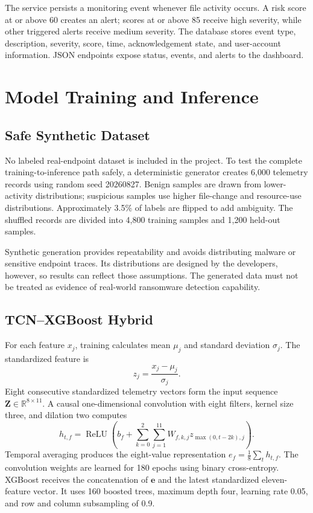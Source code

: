 \documentclass[conference]{IEEEtran}
\begin{document}
The service persists a monitoring event whenever file activity occurs. A risk
score at or above 60 creates an alert; scores at or above 85 receive high
severity, while other triggered alerts receive medium severity. The database
stores event type, description, severity, score, time, acknowledgement state,
and user-account information. JSON endpoints expose status, events, and alerts
to the dashboard.

\section{Model Training and Inference}
\subsection{Safe Synthetic Dataset}
No labeled real-endpoint dataset is included in the project. To test the complete
training-to-inference path safely, a deterministic generator creates 6,000
telemetry records using random seed 20260827. Benign samples are drawn from
lower-activity distributions; suspicious samples use higher file-change and
resource-use distributions. Approximately 3.5\% of labels are flipped to add
ambiguity. The shuffled records are divided into 4,800 training samples and 1,200
held-out samples.

Synthetic generation provides repeatability and avoids distributing malware or
sensitive endpoint traces. Its distributions are designed by the developers,
however, so results can reflect those assumptions. The generated data must not
be treated as evidence of real-world ransomware detection capability.

\subsection{TCN--XGBoost Hybrid}
For each feature $x_j$, training calculates mean $\mu_j$ and standard deviation
$\sigma_j$. The standardized feature is
\begin{equation}
z_j = \frac{x_j-\mu_j}{\sigma_j}.
\end{equation}
Eight consecutive standardized telemetry vectors form the input sequence
$\mathbf{Z}\in\mathbb{R}^{8\times11}$. A causal one-dimensional convolution with
eight filters, kernel size three, and dilation two computes
\begin{equation}
h_{t,f}=\operatorname{ReLU}\!\left(b_f+\sum_{k=0}^{2}\sum_{j=1}^{11}
W_{f,k,j}z_{\max(0,t-2k),j}\right).
\end{equation}
Temporal averaging produces the eight-value representation
$e_f=\frac{1}{8}\sum_t h_{t,f}$. The convolution weights are learned for 180 epochs
using binary cross-entropy. XGBoost receives the concatenation of $\mathbf{e}$ and
the latest standardized eleven-feature vector. It uses 160 boosted trees, maximum
depth four, learning rate 0.05, and row and column subsampling of 0.9.
\end{document}
